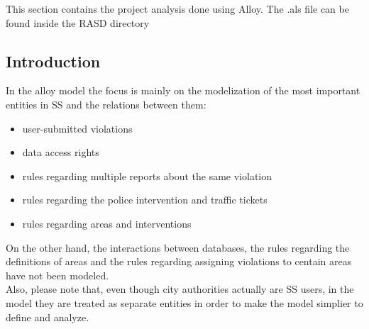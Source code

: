 
This section contains the project analysis done using Alloy. The .als file can be found inside the RASD directory \\
\subsection{Introduction}
In the alloy model the focus is mainly on the modelization of the most important entities in SS and the relations between them:
\begin{itemize}
	\item user-submitted violations
	\item data access rights
	\item rules regarding multiple reports about the same violation
	\item rules regarding the police intervention and traffic tickets
	\item rules regarding areas and interventions  
\end{itemize}
On the other hand, the interactions between databases, the rules regarding the definitions of areas and the rules regarding assigning violations to centain areas have not been modeled.\\
Also, please note that, even though city authorities actually are SS users, in the model they are treated as separate entities in order to make the model simplier to define and analyze.\\
